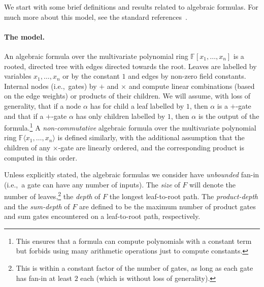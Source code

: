 \documentclass[10pt,a4paper]{article}
\newcommand{\F}{\mathbb{F}}
\newcommand{\comment}[2]{\marginpar{\tiny{\textbf{#1: }\textit{#2}}}}
\newcommand{\gm}[1]{\comment{GM}{#1}}
\begin{document}
We start with some brief definitions and results related to algebraic formulas. For much more about this model, see the standard references~\cite{SY,Ramprasadsurvey}.

\paragraph{The model.} An algebraic formula over the multivariate polynomial ring $\F[x_1,\ldots,x_n]$ is a rooted, directed tree with edges directed towards the root. Leaves are labelled by variables $x_1,\ldots,x_n$ or by the constant \(1\) and edges by non-zero field constants. Internal nodes (i.e.,~gates) by $+$ and $\times$ and compute linear combinations (based on the edge weights) or products of their children. We will assume, with loss of generality, that if a node \(\alpha\) has for child a leaf labelled by \(1\), then \(\alpha\)  is a \(+\)-gate and that if a \(+\)-gate \(\alpha\) has only children labelled by \(1\), then \(\alpha\) is the output of the formula.\footnote{This ensures that a formula can compute polynomials with a constant term but forbids using many arithmetic operations just to compute constants.}
A \emph{non-commutative} algebraic formula  over the multivariate polynomial ring $\F\langle x_1,\ldots,x_n\rangle$ is defined similarly, with the additional assumption that the children of any $\times$-gate are linearly ordered, and the corresponding product is computed in this order.

Unless explicitly stated, the algebraic formulas we consider have \emph{unbounded} fan-in (i.e.,~a gate can have any number of inputs). The \emph{size} of $F$ will denote the number of leaves,\footnote{\label{ft:fanin}This is within a constant factor of the number of gates, as long as each gate has fan-in at least $2$ each (which is without loss of generality).} the \emph{depth} of $F$ the longest leaf-to-root path. The \emph{product-depth} and the \emph{sum-depth} of $F$ are defined to be the maximum number of product gates and sum gates encountered on a leaf-to-root path, respectively.
\end{document}
